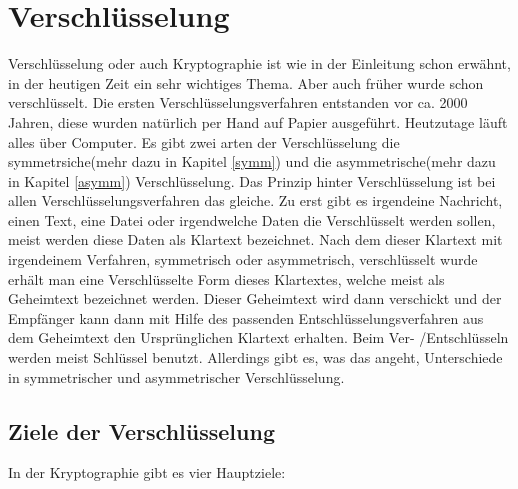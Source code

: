 \documentclass[a4paper,12pt,titlepage]{article}
\begin{document}
\section{Verschlüsselung}
Verschlüsselung oder auch Kryptographie ist wie in der Einleitung schon erwähnt, in der heutigen Zeit ein sehr wichtiges Thema. Aber auch früher wurde schon verschlüsselt. Die ersten Verschlüsselungsverfahren entstanden vor ca. 2000 Jahren, diese wurden natürlich per Hand auf Papier ausgeführt. 
Heutzutage läuft alles über Computer. \newline
Es gibt zwei arten der Verschlüsselung die symmetrsiche(mehr dazu in Kapitel \ref{symm}) und die asymmetrische(mehr dazu in Kapitel \ref{asymm}) Verschlüsselung.
Das Prinzip hinter Verschlüsselung ist bei allen Verschlüsselungsverfahren das gleiche. Zu erst gibt es irgendeine Nachricht, einen Text, eine Datei oder irgendwelche Daten die Verschlüsselt werden sollen, meist werden diese Daten als Klartext bezeichnet.
Nach dem dieser Klartext mit irgendeinem Verfahren, symmetrisch oder asymmetrisch, verschlüsselt wurde erhält man eine Verschlüsselte Form dieses Klartextes, welche meist als Geheimtext bezeichnet werden. Dieser Geheimtext wird dann verschickt und der Empfänger kann dann mit Hilfe des passenden Entschlüsselungsverfahren aus dem Geheimtext den Ursprünglichen Klartext erhalten. Beim Ver- /Entschlüsseln werden meist Schlüssel benutzt. Allerdings gibt es, was das angeht, Unterschiede in symmetrischer und asymmetrischer Verschlüsselung.

\subsection{Ziele der Verschlüsselung}
In der Kryptographie gibt es vier Hauptziele:
\end{document}
